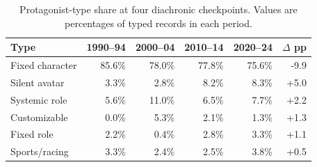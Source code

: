 \begin{table}[t]
\centering
\caption{Protagonist-type share at four diachronic checkpoints. Values are percentages of typed records in each period.}
\label{tab:protagonist_type_share_checkpoints}
\small
\setlength{\tabcolsep}{4pt}
\begin{tabular}{lrrrrr}
\toprule
\textbf{Type} & \textbf{1990--94} & \textbf{2000--04} & \textbf{2010--14} & \textbf{2020--24} & \textbf{$\Delta$ pp} \\
\midrule
Fixed character & 85.6\% & 78.0\% & 77.8\% & 75.6\% & -9.9 \\
Silent avatar & 3.3\% & 2.8\% & 8.2\% & 8.3\% & +5.0 \\
Systemic role & 5.6\% & 11.0\% & 6.5\% & 7.7\% & +2.2 \\
Customizable & 0.0\% & 5.3\% & 2.1\% & 1.3\% & +1.3 \\
Fixed role & 2.2\% & 0.4\% & 2.8\% & 3.3\% & +1.1 \\
Sports/racing & 3.3\% & 2.4\% & 2.5\% & 3.8\% & +0.5 \\
\bottomrule
\end{tabular}
\end{table}
